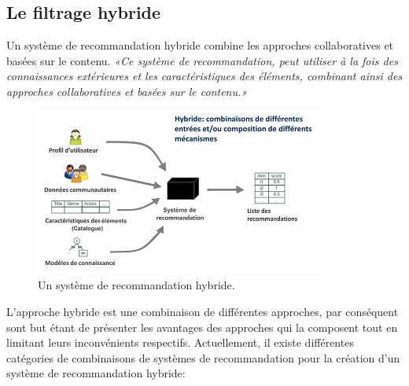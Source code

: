 \subsection{Le filtrage hybride}

Un système de recommandation hybride combine les approches collaboratives et basées sur le contenu. \textit{«Ce système de recommandation, peut utiliser à la fois  des connaissances extérieures et les caractéristiques des éléments, combinant ainsi des approches collaboratives et basées sur le contenu.»}\supercite{elsaNegre}


\vspace{5mm}

\begin{figure}[htp]
  \centering
  \includegraphics[width=95mm]{./src_img/rs-hybride}
  \caption{Un système de recommandation hybride\supercite{RSIntro}.}
  \label{fig:quatro}
\end{figure}

\vspace{5mm}

L'approche hybride est une combinaison de différentes approches, par conséquent sont but étant de présenter les avantages des approches qui la composent tout en limitant leurs inconvénients respectifs. Actuellement, il existe différentes catégories de combinaisons de systèmes de recommandation pour la création d'un système de recommandation hybride\supercite{RobinBurke,RSIntro}: 

\vspace{5mm}



